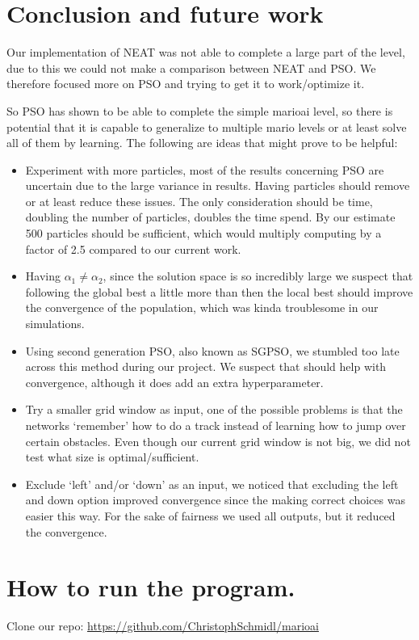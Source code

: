 \documentclass[]{article}
\begin{document}
\section{Conclusion and future work}
Our implementation of NEAT was not able to complete a large part of the level, due to this we could not make a comparison between NEAT and PSO. We therefore focused more on PSO and trying to get it to work/optimize it.\bigskip

So PSO has shown to be able to complete the simple marioai level, so there is potential that it is capable to generalize to multiple mario levels or at least solve all of them by learning. The following are ideas that might prove to be helpful:
\begin{itemize}
    \item Experiment with more particles, most of the results concerning PSO are uncertain due to the large variance in results. Having particles should remove or at least reduce these issues. The only consideration should be time, doubling the number of particles, doubles the time spend. By our estimate 500 particles should be sufficient, which would multiply computing by a factor of 2.5 compared to our current work.
    \item Having $\alpha_1 \neq \alpha_2$, since the solution space is so incredibly large we suspect that following the global best a little more than then the local best should improve the convergence of the population, which was kinda troublesome in our simulations.
    \item Using second generation PSO, also known as SGPSO, we stumbled too late across this method during our project. We suspect that should help with convergence, although it does add an extra hyperparameter.
    \item Try a smaller grid window as input, one of the possible problems is that the networks `remember' how to do a track instead of learning how to jump over certain obstacles. Even though our current grid window is not big, we did not test what size is optimal/sufficient.
    \item Exclude `left' and/or `down' as an input, we noticed that excluding the left and down option improved convergence since the making correct choices was easier this way. For the sake of fairness we used all outputs, but it reduced the convergence.
\end{itemize}


\clearpage
\appendix
\section{How to run the program.}
Clone our repo: \url{https://github.com/ChristophSchmidl/marioai}
\end{document}
